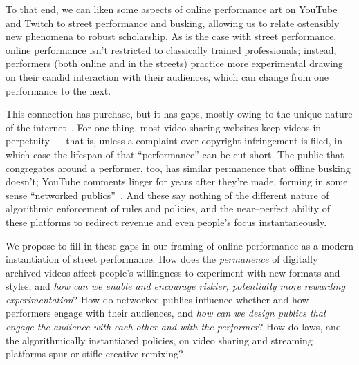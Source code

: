 \documentclass[10pt]{article}
\newcommand{\topic}[1]{{\color{Blue}#1}}
\renewcommand{\topic}[1]{{#1}}
\begin{document}
\topic{To that end, we can liken some aspects of online performance art on YouTube and Twitch
to street performance and busking,
allowing us to relate ostensibly new phenomena to robust scholarship.}
As is the case with street performance,
online performance isn't restricted to classically trained professionals;
instead, performers (both online and in the streets) practice more experimental 
drawing on their candid interaction with their audiences,
which can change from one performance to the next.

\topic{This connection has purchase, but it has gaps, mostly owing to the unique nature of the internet~\cite{miller2011understanding}.}
For one thing, most video sharing websites keep videos
in perpetuity
--- that is, unless a complaint over copyright infringement is filed, in which case the lifespan of that ``performance'' can be cut short.
The public that congregates around a performer, too, has similar permanence that offline busking doesn't;
YouTube comments linger for years after they're made, forming in some sense ``networked publics''~\cite{boyd2007youth}.
And these say nothing of the different nature of algorithmic enforcement of rules and policies, and
the near--perfect ability of these platforms to redirect revenue and even people's focus instantaneously.

\topic{We propose to fill in these gaps in our framing of online performance as a modern instantiation of street performance.}
How does the \textit{permanence} of digitally archived videos affect people's willingness to experiment with new formats and styles,
and \textit{how can we enable and encourage riskier, potentially more rewarding experimentation}?
How do networked publics influence whether and how performers engage with their audiences,
and \textit{how can we design publics that engage the audience with each other and with the performer}?
How do laws, and the algorithmically instantiated policies, on video sharing and streaming platforms spur or stifle creative remixing?


\end{document}
